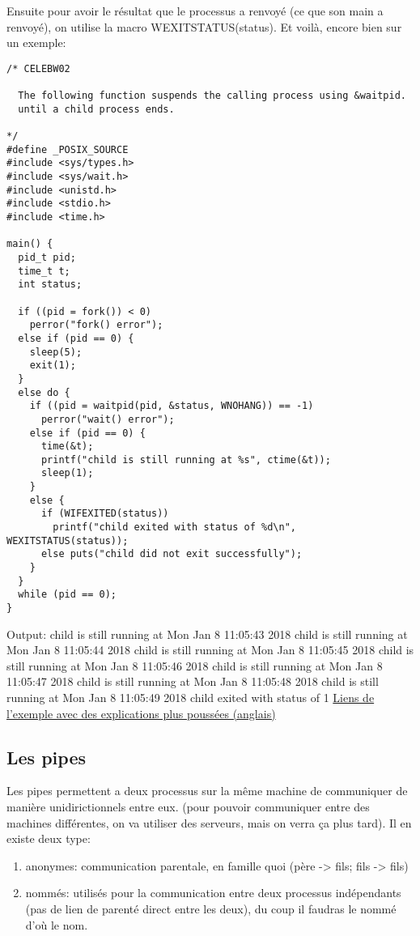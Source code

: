 \documentclass[a4paper]{article}
\begin{document}
Ensuite pour avoir le résultat que le processus a renvoyé (ce que son main a renvoyé), on utilise la macro WEXITSTATUS(status).\newpage
Et voilà, encore bien sur un exemple:
\begin{lstlisting}
/* CELEBW02

  The following function suspends the calling process using &waitpid.
  until a child process ends.

*/
#define _POSIX_SOURCE
#include <sys/types.h>
#include <sys/wait.h>
#include <unistd.h>
#include <stdio.h>
#include <time.h>

main() {
  pid_t pid;
  time_t t;
  int status;

  if ((pid = fork()) < 0)
    perror("fork() error");
  else if (pid == 0) {
    sleep(5);
    exit(1);
  }
  else do {
    if ((pid = waitpid(pid, &status, WNOHANG)) == -1)
      perror("wait() error");
    else if (pid == 0) {
      time(&t);
      printf("child is still running at %s", ctime(&t));
      sleep(1);
    }
    else {
      if (WIFEXITED(status))
        printf("child exited with status of %d\n", WEXITSTATUS(status));
      else puts("child did not exit successfully");
    }
  }
  while (pid == 0);
}
\end{lstlisting}
Output:\newline
child is still running at Mon Jan 8 11:05:43 2018\newline
child is still running at Mon Jan 8 11:05:44 2018\newline
child is still running at Mon Jan 8 11:05:45 2018\newline
child is still running at Mon Jan 8 11:05:46 2018\newline
child is still running at Mon Jan 8 11:05:47 2018\newline
child is still running at Mon Jan 8 11:05:48 2018\newline
child is still running at Mon Jan 8 11:05:49 2018\newline
child exited with status of 1\newline
\href{https://www.ibm.com/support/knowledgecenter/en/SSLTBW_2.1.0/com.ibm.zos.v2r1.bpxbd00/rtwaip.htm}{Liens de l'exemple avec des explications plus poussées (anglais)}
\subsection{Les pipes}
Les pipes permettent a deux processus sur la même machine de communiquer de manière unidirictionnels entre eux. (pour pouvoir communiquer entre des machines différentes, on va utiliser des serveurs, mais on verra ça plus tard).\newline
Il en existe deux type:
\begin{enumerate}
  \item anonymes: communication parentale, en famille quoi (père -> fils; fils -> fils)
  \item nommés: utilisés pour la communication entre deux processus indépendants (pas de lien de parenté direct entre les deux), du coup il faudras le nommé d'où le nom.
\end{enumerate}
\end{document}
